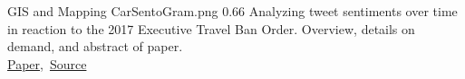 \cvexample
  {GIS and Mapping}
  {CarSentoGram.png}
  {0.66}
  {%
    Analyzing tweet sentiments over time in reaction to the 2017 Executive Travel Ban Order.
    Overview, details on demand, and abstract of paper.\\
    \raggedleft\href{https://www.tandfonline.com/doi/full/10.1080/15230406.2018.1510343}{Paper},\, \href{https://github.com/ryan-p-larson/paper}{Source}
}
